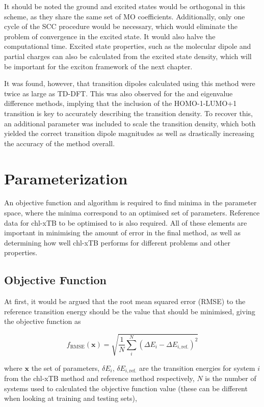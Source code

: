 It should be noted the ground and excited states would be orthogonal in this scheme,
as they share the same set of MO coefficients. Additionally, only one cycle of the
SCC procedure would be necessary, which would eliminate the problem of convergence
in the \dscf excited state. It would also halve the computational time.
Excited state properties, such as the molecular dipole and partial charges can
also be calculated from the excited state density, which will be important for
the exciton framework of the next chapter.

It was found, however, that transition dipoles calculated using this method were
twice as large as TD-DFT. This was also observed for the \dscf and eigenvalue
difference methods, implying that the inclusion of the HOMO-1-LUMO+1 transition
is key to accurately describing the transition density. To recover this, an additional
parameter was included to scale the transition density, which both yielded the 
correct transition dipole magnitudes as well as drastically increasing the accuracy
of the method overall.

\afterpartskip
\section{Parameterization}
\label{sec:chl_params}
An objective function and algorithm is required to find minima in the parameter 
space, where the minima correspond to an optimised set of parameters. Reference data
for chl-xTB to be optimised to is also required. All of these elements are important
in minimising the amount of error in the final method, as well as determining how
well chl-xTB performs for different problems and other properties.

\subsection{Objective Function}
\label{subsec:obj_func}
At first, it would be argued that the root mean squared error (RMSE) to the reference 
transition energy should be the value that should be minimised, giving the objective
function as

\begin{equation}
f_{\text{RMSE}}\left(\mathbf{x}\right) = \sqrt{ \frac{1}{N} \sum^N_i \left( \Delta E_i  - \Delta E_{i, \text{ref.}}\right)^2}
\end{equation}

where $\textbf{x}$ the set of parameters, $\delta E_i$, $\delta E_{i,\text{ref.}}$ 
are the transition energies for system $i$ from the chl-xTB method and reference
method respectively, $N$ is the number of systems used to calculated the objective
function value (these can be different when looking at training and testing sets),

